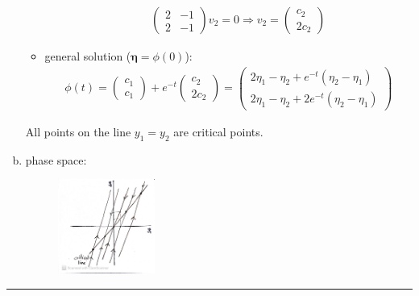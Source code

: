 \documentclass[12pt, letterpaper]{scrartcl}
\begin{document}
\begin{enumerate}[(a)]
\begin{itemize}
\begin{itemize}
\begin{align*}
            \left(\begin{array}{cc}
            2 & -1 \\
            2 & -1 
            \end{array}\right)
            v_2=0
            \Longrightarrow
            v_2=\left(\begin{array}{c}
            c_2 \\
            2c_2 
            \end{array}\right)
        \end{align*}
    \end{itemize}
    \item general solution (${\boldsymbol\eta}=\phi(0)$):
    \begin{align*}
        \phi(t)=
        \left(\begin{array}{c}
            c_1 \\
            c_1 
        \end{array}\right)
        +
        e^{-t}
        \left(\begin{array}{c}
            c_2 \\
            2c_2 
        \end{array}\right)
        =
        \left(\begin{array}{c}
            2\eta_1-\eta_2+e^{-t}(\eta_2-\eta_1) \\
            2\eta_1-\eta_2+2e^{-t}(\eta_2-\eta_1) 
        \end{array}\right)
    \end{align*}
    \end{itemize}

    All points on the line $y_1=y_2$ are critical points.
    \item phase space: 
    \begin{figure}[H]
    \centering
    \includegraphics[width=0.3\textwidth]{fig/2.8.19.JPG}
    \end{figure}
\end{enumerate}
\vskip1mm\hrule
\end{document}
